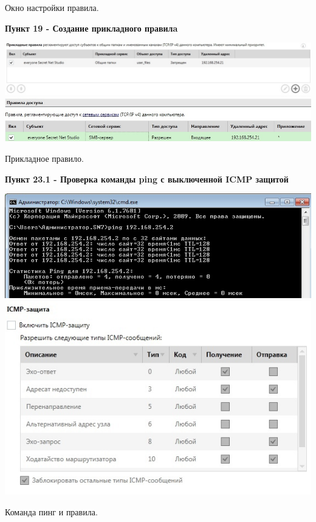 \documentclass[a4paper,14pt]{extarticle}
\begin{document}
\begin{center}
\begin{multicols}{2}
        \end{multicols}

        Окно настройки правила.
    \end{center}

    \newpage
    \textbf{Пункт 19 - Создание прикладного правилa}
    \begin{center}
        \includegraphics[scale=0.42]{pics/19_1.jpg}\\
        \includegraphics[scale=0.55]{pics/19_2.jpg}

        Прикладное правило.
    \end{center}
  
    \textbf{Пункт 23.1 - Проверка команды ping с выключенной ICMP защитой}
    \begin{center}
        \begin{multicols}{2}
            \includegraphics[scale=0.4]{pics/23.1_1.jpg}
            \includegraphics[scale=0.4]{pics/23.1_2.jpg}
        \end{multicols}

        Команда пинг и правила.
    \end{center}
\end{document}
